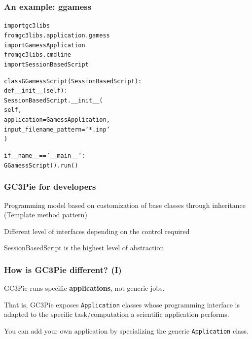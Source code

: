 \documentclass[english,serif,mathserif,xcolor=pdftex,dvipsnames,table]{beamer}
\begin{document}
\begin{frame}[fragile]
  \frametitle{An example: ggamess}
  \begin{alltt}
import gc3libs
from gc3libs.application.gamess
     {\color{Blue}import} GamessApplication
from gc3libs.cmdline
     {\color{Blue}import} SessionBasedScript

class {\color{Violet} GGamessScript}({\color{Violet}SessionBasedScript}):
  def \_\_init\_\_(self):
    SessionBasedScript.\_\_init\_\_(
       self,
       application = {\color{Violet}GamessApplication},
       input_filename_pattern = '{\color{Green}*.inp}'
    )

if \_\_name\_\_ == '{\color{Green}\_\_main\_\_}':
  GGamessScript().{\color{Blue}run()}
\end{alltt}
\end{frame}



\begin{frame}
  \frametitle{GC3Pie for developers}
    \begin{block}{}
      Programming model based on customization of base classes through
      inheritance ({\color{Blue}Template method} pattern)
    \end{block}

    \begin{block}{}
      Different level of {\color{Blue}interfaces} depending on the control required
    \end{block}

    \begin{block}{}
      {\color{Blue}SessionBasedScript} is the highest level of abstraction
    \end{block}
\end{frame}

\begin{frame}
  \frametitle{How is GC3Pie different? (I)}

  \begin{block}{}
    GC3Pie runs specific \textbf{applications}, not generic jobs.
  \end{block}

   \begin{block}{}
     That is, GC3Pie exposes \texttt{Application} classes whose programming
    interface is adapted to the specific task/computation a scientific
    application performs.
  \end{block}

  \begin{block}{}
    You can add your own application by specializing the generic
    \texttt{Application} class.
  \end{block}
\end{frame}
\end{document}
